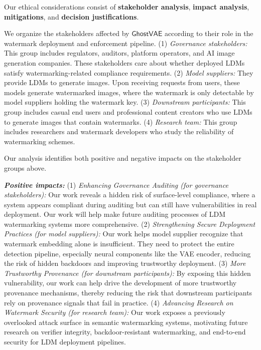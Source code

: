 \documentclass[letterpaper,twocolumn,10pt]{article}
\newcommand{\mg}{$\mathsf{GhostVAE}$\xspace}
\newcommand{\mypara}[1]{\smallskip\noindent{\bf {#1}.} \xspace}
\begin{document}
Our ethical considerations consist of \textbf{stakeholder analysis}, \textbf{impact analysis}, \textbf{mitigations}, and \textbf{decision justifications}.

\mypara{Stakeholder Analysis}
We organize the stakeholders affected by \mg according to their role in the watermark deployment and enforcement pipeline.
(1) \emph{Governance stakeholders:} This group includes regulators, auditors, platform operators, and AI image generation companies. These stakeholders care about whether deployed LDMs satisfy watermarking-related compliance requirements.
(2) \emph{Model suppliers:} They provide LDMs to generate images. Upon receiving requests from users, these models generate watermarked images, where the watermark is only detectable by model suppliers holding the watermark key.
(3) \emph{Downstream participants:} This group includes casual end users and professional content creators who use LDMs to generate images that contain watermarks.
(4) \emph{Research team:} This group includes researchers and watermark developers who study the reliability of watermarking schemes.


\mypara{Impact Analysis}
Our analysis identifies both positive and negative impacts on the stakeholder groups above.

\emph{\textbf{Positive impacts:}}
(1) \emph{Enhancing Governance Auditing (for governance stakeholders):} Our work reveals a hidden risk of surface-level compliance, where a system appears compliant during auditing but can still have vulnerabilities in real deployment. Our work will help make future auditing processes of LDM watermarking systems more comprehensive.
(2) \emph{Strengthening Secure Deployment Practices (for model suppliers):} Our work helps model supplier recognize that watermark embedding alone is insufficient. They need to protect the entire detection pipeline, especially neural components like the VAE encoder, reducing the risk of hidden backdoors and improving trustworthy deployment.
(3) \emph{More Trustworthy Provenance (for downstream participants):} By exposing this hidden vulnerability, our work can help drive the development of more trustworthy provenance mechanisms, thereby reducing the risk that downstream participants rely on provenance signals that fail in practice.
(4) \emph{Advancing Research on Watermark Security (for research team):} Our work exposes a previously overlooked attack surface in semantic watermarking systems, motivating future research on verifier integrity, backdoor-resistant watermarking, and end-to-end security for LDM deployment pipelines.
\end{document}
